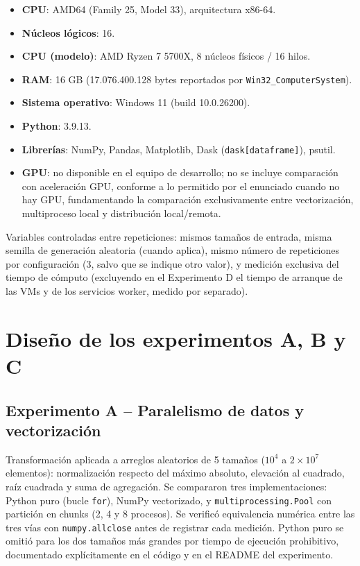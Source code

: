 \documentclass[11pt]{article}
\begin{document}
\begin{itemize}
  \item \textbf{CPU}: AMD64 (Family 25, Model 33), arquitectura x86-64.
  \item \textbf{Núcleos lógicos}: 16.
  \item \textbf{CPU (modelo)}: AMD Ryzen 7 5700X, 8 núcleos físicos / 16 hilos.
  \item \textbf{RAM}: 16 GB (17.076.400.128 bytes reportados por \texttt{Win32\_ComputerSystem}).
  \item \textbf{Sistema operativo}: Windows 11 (build 10.0.26200).
  \item \textbf{Python}: 3.9.13.
  \item \textbf{Librerías}: NumPy, Pandas, Matplotlib, Dask (\texttt{dask[dataframe]}), psutil.
  \item \textbf{GPU}: no disponible en el equipo de desarrollo; no se incluye comparación con aceleración GPU, conforme a lo permitido por el enunciado cuando no hay GPU, fundamentando la comparación exclusivamente entre vectorización, multiproceso local y distribución local/remota.
\end{itemize}

Variables controladas entre repeticiones: mismos tamaños de entrada, misma
semilla de generación aleatoria (cuando aplica), mismo número de
repeticiones por configuración (3, salvo que se indique otro valor), y
medición exclusiva del tiempo de cómputo (excluyendo en el Experimento D el
tiempo de arranque de las VMs y de los servicios worker, medido por
separado).

\section{Diseño de los experimentos A, B y C}

\subsection{Experimento A -- Paralelismo de datos y vectorización}

Transformación aplicada a arreglos aleatorios de 5 tamaños (\(10^4\) a
\(2\times10^7\) elementos): normalización respecto del máximo absoluto,
elevación al cuadrado, raíz cuadrada y suma de agregación. Se compararon
tres implementaciones: Python puro (bucle \texttt{for}), NumPy vectorizado,
y \texttt{multiprocessing.Pool} con partición en chunks (2, 4 y 8
procesos). Se verificó equivalencia numérica entre las tres vías con
\texttt{numpy.allclose} antes de registrar cada medición. Python puro se
omitió para los dos tamaños más grandes por tiempo de ejecución
prohibitivo, documentado explícitamente en el código y en el README del
experimento.
\end{document}
